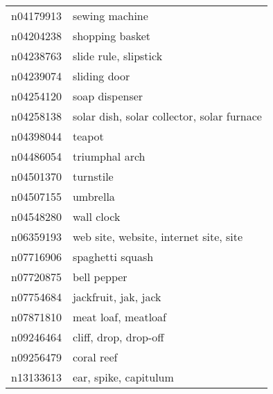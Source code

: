 \begin{appendices}
{\begin{footnotesize}
\begin{longtabu}{X|X[4]}
    		n04179913 &                                                                                                             sewing machine \tabularnewline
    		n04204238 &                                                                                                            shopping basket \tabularnewline
    		n04238763 &                                                                                                      slide rule, slipstick \tabularnewline
    		n04239074 &                                                                                                               sliding door \tabularnewline
    		n04254120 &                                                                                                             soap dispenser \tabularnewline
    		n04258138 &                                                                                 solar dish, solar collector, solar furnace \tabularnewline
    		n04398044 &                                                                                                                     teapot \tabularnewline
    		n04486054 &                                                                                                             triumphal arch \tabularnewline
    		n04501370 &                                                                                                                  turnstile \tabularnewline
    		n04507155 &                                                                                                                   umbrella \tabularnewline
    		n04548280 &                                                                                                                 wall clock \tabularnewline
    		n06359193 &                                                                                     web site, website, internet site, site \tabularnewline
    		n07716906 &                                                                                                           spaghetti squash \tabularnewline
    		n07720875 &                                                                                                                bell pepper \tabularnewline
    		n07754684 &                                                                                                       jackfruit, jak, jack \tabularnewline
    		n07871810 &                                                                                                        meat loaf, meatloaf \tabularnewline
    		n09246464 &                                                                                                      cliff, drop, drop-off \tabularnewline
    		n09256479 &                                                                                                                 coral reef \tabularnewline
    		n13133613 &                                                                                                      ear, spike, capitulum \tabularnewline
    		\bottomrule
    	\end{longtabu}
        \end{footnotesize}
    }
    \end{appendices}

    
    
    